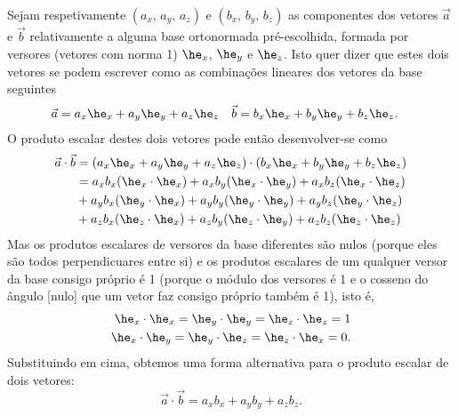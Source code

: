 Sejam respetivamente $(a_x,\,a_y,\,a_z)$ e $(b_x,\,b_y,\,b_z)$ as componentes
dos vetores $\vec a$ e $\vec b$ relativamente a alguma base ortonormada
pré-escolhida, formada por versores (vetores com norma 1) $\he_x$, $\he_y$ e
$\he_z$. Isto quer dizer que estes dois vetores se podem escrever como as
combinações lineares dos vetores da base seguintes
\begin{align*}
  \vec a&=a_x\he_x+a_y\he_y+a_z\he_z&
  \vec b&=b_x\he_x+b_y\he_y+b_z\he_z.
\end{align*}
O produto escalar destes dois vetores pode então desenvolver-se como
\begin{align*}
  \vec a\cdot\vec b&=
  (a_x\he_x+a_y\he_y+a_z\he_z) \cdot (b_x\he_x+b_y\he_y+b_z\he_z)\\
  &=a_xb_x(\he_x\cdot\he_x)+ a_xb_y(\he_x\cdot\he_y)+ a_xb_z(\he_x\cdot\he_z)\\
  &+a_yb_x(\he_y\cdot\he_x)+ a_yb_y(\he_y\cdot\he_y)+ a_yb_z(\he_y\cdot\he_z)\\
  &+a_zb_x(\he_z\cdot\he_x)+ a_zb_y(\he_z\cdot\he_y)+ a_zb_z(\he_z\cdot\he_z)
\end{align*}
Mas os produtos escalares de versores da base diferentes são nulos (porque eles
são todos perpendicuares entre si) e os produtos escalares de um qualquer versor
da base consigo próprio é 1 (porque o módulo dos versores é 1 e o cosseno do
ângulo [nulo] que um vetor faz consigo próprio também é 1), isto é,
\begin{align*}
  \he_x\cdot\he_x=\he_y\cdot\he_y=\he_z\cdot\he_z=1\\
  \he_x\cdot\he_y=\he_y\cdot\he_z=\he_z\cdot\he_x=0.
\end{align*}
Substituindo em cima, obtemos uma forma alternativa para o produto escalar de
dois vetores:
\begin{equation}
  \vec a\cdot\vec b=a_xb_x+a_yb_y+a_zb_z.
\end{equation}

